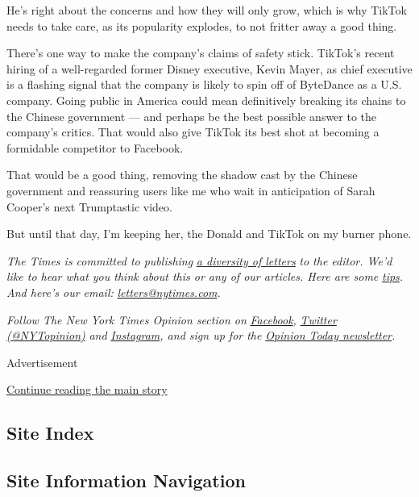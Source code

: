 He's right about the concerns and how they will only grow, which is why
TikTok needs to take care, as its popularity explodes, to not fritter
away a good thing.

There's one way to make the company's claims of safety stick. TikTok's
recent hiring of a well-regarded former Disney executive, Kevin Mayer,
as chief executive is a flashing signal that the company is likely to
spin off of ByteDance as a U.S. company. Going public in America could
mean definitively breaking its chains to the Chinese government --- and
perhaps be the best possible answer to the company's critics. That would
also give TikTok its best shot at becoming a formidable competitor to
Facebook.

That would be a good thing, removing the shadow cast by the Chinese
government and reassuring users like me who wait in anticipation of
Sarah Cooper's next Trumptastic video.

But until that day, I'm keeping her, the Donald and TikTok on my burner
phone.

\emph{The Times is committed to publishing}
\href{https://www.nytimes.com/2019/01/31/opinion/letters/letters-to-editor-new-york-times-women.html}{\emph{a
diversity of letters}} \emph{to the editor. We'd like to hear what you
think about this or any of our articles. Here are some}
\href{https://help.nytimes.com/hc/en-us/articles/115014925288-How-to-submit-a-letter-to-the-editor}{\emph{tips}}\emph{.
And here's our email:}
\href{mailto:letters@nytimes.com}{\emph{letters@nytimes.com}}\emph{.}

\emph{Follow The New York Times Opinion section on}
\href{https://www.facebook.com/nytopinion}{\emph{Facebook}}\emph{,}
\href{http://twitter.com/NYTOpinion}{\emph{Twitter (@NYTopinion)}}
\emph{and}
\href{https://www.instagram.com/nytopinion/}{\emph{Instagram}}\emph{,
and sign up for the}
\href{http://www.nytimes.com/newsletters/opiniontoday/}{\emph{Opinion
Today newsletter}}\emph{.}

Advertisement

\protect\hyperlink{after-bottom}{Continue reading the main story}

\hypertarget{site-index}{%
\subsection{Site Index}\label{site-index}}

\hypertarget{site-information-navigation}{%
\subsection{Site Information
Navigation}\label{site-information-navigation}}

